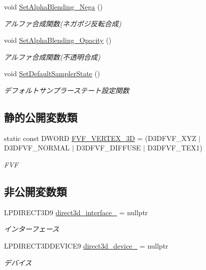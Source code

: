 \begin{DoxyCompactItemize}
void \mbox{\hyperlink{class_renderer_direct_x9_a5018efa829bf845405ac70beef7df947}{Set\+Alpha\+Blending\+\_\+\+Nega}} ()
\begin{DoxyCompactList}\small\item\em アルファ合成関数(ネガポジ反転合成) \end{DoxyCompactList}\item 
void \mbox{\hyperlink{class_renderer_direct_x9_a789206ba211e9cbffe0bfe4c7dfb7457}{Set\+Alpha\+Blending\+\_\+\+Opacity}} ()
\begin{DoxyCompactList}\small\item\em アルファ合成関数(不透明合成) \end{DoxyCompactList}\item 
void \mbox{\hyperlink{class_renderer_direct_x9_a229cd266427d96486c43d2e63300e438}{Set\+Default\+Sampler\+State}} ()
\begin{DoxyCompactList}\small\item\em デフォルトサンプラーステート設定関数 \end{DoxyCompactList}\end{DoxyCompactItemize}
\subsection*{静的公開変数類}
\begin{DoxyCompactItemize}
\item 
static const D\+W\+O\+RD \mbox{\hyperlink{class_renderer_direct_x9_a80ce0089b01354986332553353625da6}{F\+V\+F\+\_\+\+V\+E\+R\+T\+E\+X\+\_\+3D}} = (D3\+D\+F\+V\+F\+\_\+\+X\+YZ $\vert$ D3\+D\+F\+V\+F\+\_\+\+N\+O\+R\+M\+AL $\vert$ D3\+D\+F\+V\+F\+\_\+\+D\+I\+F\+F\+U\+SE $\vert$ D3\+D\+F\+V\+F\+\_\+\+T\+E\+X1)
\begin{DoxyCompactList}\small\item\em F\+VF \end{DoxyCompactList}\end{DoxyCompactItemize}
\subsection*{非公開変数類}
\begin{DoxyCompactItemize}
\item 
L\+P\+D\+I\+R\+E\+C\+T3\+D9 \mbox{\hyperlink{class_renderer_direct_x9_a1616ee343f701fe647ed8d1727c8229d}{direct3d\+\_\+interface\+\_\+}} = nullptr
\begin{DoxyCompactList}\small\item\em インターフェース \end{DoxyCompactList}\item 
L\+P\+D\+I\+R\+E\+C\+T3\+D\+D\+E\+V\+I\+C\+E9 \mbox{\hyperlink{class_renderer_direct_x9_aba9ae366d583e965418423ec76454a61}{direct3d\+\_\+device\+\_\+}} = nullptr
\begin{DoxyCompactList}\small\item\em デバイス \end{DoxyCompactList}\end{DoxyCompactItemize}


